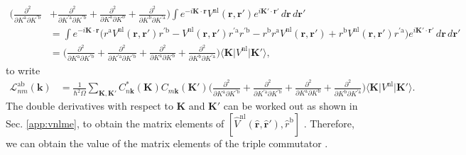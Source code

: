 \begin{align}\label{3.4}
\Big(
 \frac{\partial^{2}}{\partial K^\mathrm{a}\partial K^{\prime\mathrm{b}}}
&+\frac{\partial^{2}}{\partial K^{\prime\mathrm{a}}\partial K^{\prime\mathrm{b}}}
+\frac{\partial^{2}}{\partial K^\mathrm{a}\partial K^\mathrm{b}}
+\frac{\partial^{2}}{\partial K^\mathrm{b}\partial K^{\prime\mathrm{a}}}
\Big)
\int
e^{-i\mathbf{K}\cdot\mathbf{r}}
V^\mathrm{nl}(\mathbf{r},\mathbf{r}')
e^{i\mathbf{K}'\cdot\mathbf{r}'}
\,d\mathbf{r}\,d\mathbf{r}'\nonumber\\
&= \int e^{-i\mathbf{K}\cdot\mathbf{r}}
\Big( 
  r^{\mathrm{a}}V^\mathrm{nl}(\mathbf{r},\mathbf{r}')r^{\prime\mathrm{b}}
- V^\mathrm{nl}(\mathbf{r},\mathbf{r}')r^{\prime\mathrm{a}}r^{\prime\mathrm{b}}
- r^\mathrm{b}r^{\mathrm{a}}V^\mathrm{nl}(\mathbf{r},\mathbf{r}')
+ r^\mathrm{b}V^\mathrm{nl}(\mathbf{r},\mathbf{r}')r^{\prime\mathrm{a}}
\Big)  
e^{i\mathbf{K}'\cdot\mathbf{r}'}\,d\mathbf{r}\,d\mathbf{r}'\nonumber\\
&= \Big(
 \frac{\partial^{2}}{\partial K^\mathrm{a}\partial K^{\prime\mathrm{b}}}
+\frac{\partial^{2}}{\partial K^{\prime\mathrm{a}}\partial K^{\prime\mathrm{b}}}
+\frac{\partial^{2}}{\partial K^\mathrm{a}\partial K^\mathrm{b}}
+\frac{\partial^{2}}{\partial K^\mathrm{b}\partial K^{\prime\mathrm{a}}}
\Big)
\langle\mathbf{K}\vert V^\mathrm{nl} \vert\mathbf{K}'\rangle,
\end{align}
to write
\begin{align}\label{3.7}
\mathcal{L}^{\mathrm{ab}}_{nm}(\mathbf{k})
&= \frac{1}{\hbar^{2}\Omega}
\sum_{\mathbf{K},\mathbf{K}'} 
C^{*}_{n\mathbf{k}}(\mathbf{K})C_{m\mathbf{k}}(\mathbf{K}')
\Big(
 \frac{\partial^{2}}{\partial K^\mathrm{a}\partial K^{\prime\mathrm{b}}}
+\frac{\partial^{2}}{\partial K^{\prime\mathrm{a}}\partial K^{\prime\mathrm{b}}}
+\frac{\partial^{2}}{\partial K^\mathrm{a}\partial K^\mathrm{b}}
+\frac{\partial^{2}}{\partial K^\mathrm{b}\partial K^{\prime\mathrm{a}}}
\Big)
\langle\mathbf{K}\vert V^\mathrm{nl} \vert\mathbf{K}'\rangle.
\end{align} 
The double derivatives with respect to $\mathbf{K}$ and $\mathbf{K}'$ can be
worked out as shown in Sec. \ref{app:vnlme}, to obtain the matrix elements of
$[\hat{V}^\mathrm{nl}(\hat{\mathbf{r}},\hat{\mathbf{r}}'),\hat{r}^\mathrm{b}]$
\cite{olevano}. Therefore, we can obtain the value of the matrix elements of the
triple commutator \cite{valerie}.

